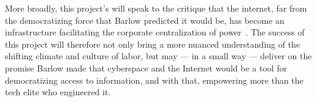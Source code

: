 \documentclass{article}
\begin{document}
More broadly, this project's will speak to the critique that the internet,
far from the democratizing force that Barlow predicted it would be,
has become an infrastructure facilitating the corporate centralization of power~\cite{barlow2009declaration,jones2011does,EboCybertopia}.
The success of this project will therefore not only
bring a more nuanced understanding of the shifting climate and culture of labor,
but may
--- in a small way ---
deliver on the promise Barlow made that
cyberspace and the Internet would be a tool for democratizing access to information, and with that,
empowering more than the tech elite who engineered it.


\pagebreak
\printbibliography{}
% 
% 
\end{document}
